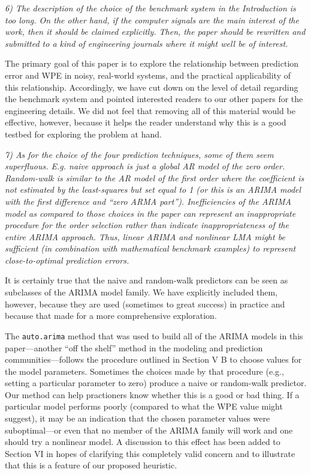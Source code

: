 \documentclass[12pt]{article}
\begin{document}
\smallskip

\emph{6) The description of the choice of the benchmark system in the
  Introduction is too long. On the other hand, if the computer signals
  are the main interest of the work, then it should be claimed
  explicitly. Then, the paper should be rewritten and submitted to a
  kind of engineering journals where it might well be of interest.}

The primary goal of this paper is to explore the relationship between
prediction error and WPE in noisy, real-world systems, and the
practical applicability of this relationship.  Accordingly, we have
cut down on the level of detail regarding the benchmark system and
pointed interested readers to our other papers for the engineering
details.  We did not feel that removing all of this material would
be effective, however, because it helps the reader understand why
this is a good testbed for exploring the problem at hand.

\smallskip

\emph{7) As for the choice of the four prediction techniques, some of
  them seem superfluous. E.g. naive approach is just a global AR model
  of the zero order.  Random-walk is similar to the AR model of the
  first order where the coefficient is not estimated by the
  least-squares but set equal to 1 (or this is an ARIMA model with the
  first difference and ``zero ARMA part''). Inefficiencies of the
  ARIMA model as compared to those choices in the paper can represent
  an inappropriate procedure for the order selection rather than
  indicate inappropriateness of the entire ARIMA approach. Thus,
  linear ARIMA and nonlinear LMA might be sufficient (in combination
  with mathematical benchmark examples) to represent close-to-optimal
  prediction errors.}

It is certainly true that the naive and random-walk predictors can be
seen as subclasses of the ARIMA model family.  We have explicitly
included them, however, because they are used (sometimes to great
success) in practice and because that made for a more comprehensive exploration.

The {\tt auto.arima} method that was used to build all of the ARIMA
models in this paper---another ``off the shelf'' method in the
modeling and prediction communities---follows the procedure outlined
in Section V B to choose values for the model parameters.
Sometimes the choices made by that procedure (e.g., setting a
particular parameter to zero) produce a naive or random-walk
predictor.  Our method can help practioners know whether this is a
good or bad thing.  If a particular model performs poorly (compared to
what the WPE value might suggest), it may be an indication that the
chosen parameter values were suboptimal---or even that no member of
the ARIMA family will work and one should try a nonlinear model. A discussion to this effect has been added to Section
VI in hopes of clarifying this completely valid concern and to illustrate that this is a feature of our proposed heuristic.
\end{document}
